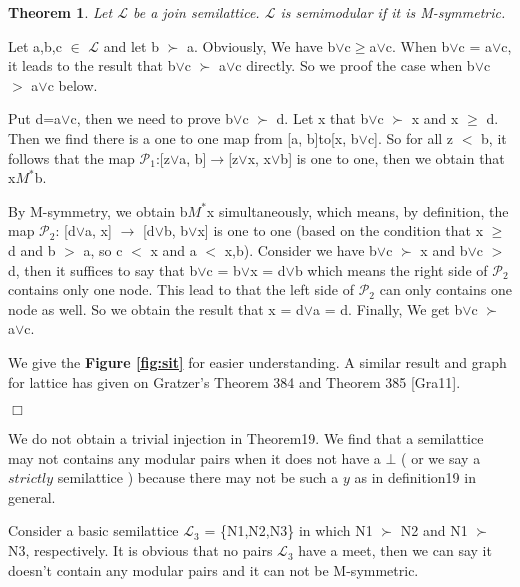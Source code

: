 \documentclass{article}
\newenvironment{proof}{\par \noindent {\bf Proof:}}{\begin{flushright}$\Box$\end{flushright}\par \noindent}
\newtheorem{theorem}{\bf Theorem}
\begin{document}
\begin{theorem}
Let $\mathcal{L}$ be a join semilattice. $\mathcal{L}$ is semimodular if it is M-symmetric.
\end{theorem}
\begin{proof}
 Let a,b,c $\in$ $\mathcal{L}$ and let b $\succ$ a. Obviously, We have  b$\vee$c$ \geq $a$\vee$c. When b$\vee$c = a$\vee$c, it leads to the result that  b$\vee$c $\succ$ a$\vee$c directly. So we proof the case when b$\vee$c $>$ a$\vee$c below.
 
Put d=a$\vee$c, then we need to prove b$\vee$c $\succ$ d. Let x that b$\vee$c $\succ$ x and x $\geq$ d. Then we find there is a one to one map from [a, b]to[x, b$\vee$c]. So for all z $<$ b, it follows that the map $\mathcal{P}_{1}$:[z$\vee$a, b]$\rightarrow$[z$\vee$x, x$\vee$b] is one to one, then we obtain that x$M^{*}$b.
 
By M-symmetry, we obtain  b$M^{*}$x simultaneously, which means, by definition, the map $\mathcal{P}_{2}$: [d$\vee$a, x] $\rightarrow$ [d$\vee$b, b$\vee$x] is one to one (based on the condition that x $\geq$ d and b $>$ a, so c $<$ x and a $<$ x,b). Consider we have b$\vee$c $\succ$ x and b$\vee$c $>$ d, then it suffices to say that b$\vee$c = b$\vee$x = d$\vee$b which means the right side of $\mathcal{P}_{2}$ contains only one node. This lead to that the left side of $\mathcal{P}_{2}$ can only contains one node as well. So we obtain the result that x = d$\vee$a = d. Finally, We get  b$\vee$c $\succ$ a$\vee$c.
 
We give the \textbf{Figure \ref{fig:sit}} for easier understanding. A similar result and graph for lattice has given on Gratzer's Theorem 384 and Theorem 385 [Gra11].

\end{proof}

 We do not obtain a trivial injection in Theorem19. We find that a semilattice may not contains any modular pairs when it does not have a $\bot$ ( or we say a $strictly$ semilattice ) because there may not be such a $y$ as in definition19 in general. 

Consider a basic semilattice $\mathcal{L}_{3}$ = \{N1,N2,N3\} in which N1 $\succ$ N2 and N1 $\succ$ N3, respectively. It is obvious that no pairs $\mathcal{L}_{3}$ have a meet, then we can say it doesn't contain any modular pairs and it can not be M-symmetric. 
\end{document}
